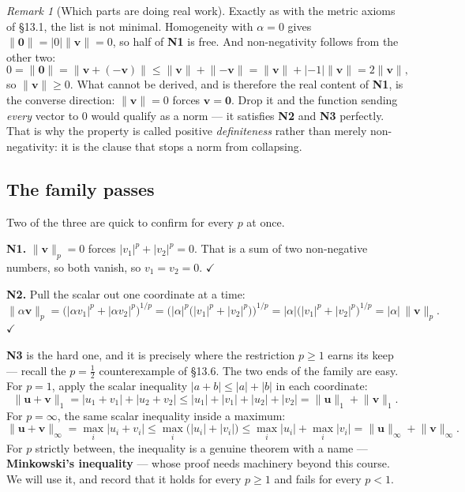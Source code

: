 \documentclass[11pt]{article}
\theoremstyle{definition}
\theoremstyle{remark}
\newtheorem*{rmk}{Remark}
\newcommand{\vc}[1]{\mathbf{#1}}
\newcommand{\norm}[1]{\lVert #1\rVert}
\begin{document}
\begin{rmk}[Which parts are doing real work]
Exactly as with the metric axioms of \S13.1, the list is not minimal.
Homogeneity with $\alpha=0$ gives $\norm{\vc{0}}=\lvert 0\rvert\norm{\vc{v}}=0$,
so half of \textbf{N1} is free. And non-negativity follows from the other two:
\[
  0 = \norm{\vc{0}} = \norm{\vc{v}+(-\vc{v})}
    \le \norm{\vc{v}}+\norm{-\vc{v}}
    = \norm{\vc{v}}+\lvert-1\rvert\norm{\vc{v}}
    = 2\norm{\vc{v}} ,
\]
so $\norm{\vc{v}}\ge0$. What cannot be derived, and is therefore the real
content of \textbf{N1}, is the converse direction: $\norm{\vc{v}}=0$ forces
$\vc{v}=\vc{0}$. Drop it and the function sending \emph{every} vector to $0$
would qualify as a norm --- it satisfies \textbf{N2} and \textbf{N3} perfectly.
That is why the property is called positive \emph{definiteness} rather than
merely non-negativity: it is the clause that stops a norm from collapsing.
\end{rmk}

\subsection{The family passes}
Two of the three are quick to confirm for every $p$ at once.

\smallskip
\noindent\textbf{N1.} $\norm{\vc{v}}_p=0$ forces
$\lvert v_1\rvert^{p}+\lvert v_2\rvert^{p}=0$. That is a sum of two
non-negative numbers, so both vanish, so $v_1=v_2=0$. \hfill$\checkmark$

\smallskip
\noindent\textbf{N2.} Pull the scalar out one coordinate at a time:
\[
  \norm{\alpha\vc{v}}_p
  = \bigl(\lvert\alpha v_1\rvert^{p}+\lvert\alpha v_2\rvert^{p}\bigr)^{1/p}
  = \bigl(\lvert\alpha\rvert^{p}
     \bigl(\lvert v_1\rvert^{p}+\lvert v_2\rvert^{p}\bigr)\bigr)^{1/p}
  = \lvert\alpha\rvert
     \bigl(\lvert v_1\rvert^{p}+\lvert v_2\rvert^{p}\bigr)^{1/p}
  = \lvert\alpha\rvert\,\norm{\vc{v}}_p .
\]
\hfill$\checkmark$

\smallskip
\noindent\textbf{N3} is the hard one, and it is precisely where the restriction
$p\ge1$ earns its keep --- recall the $p=\tfrac12$ counterexample of \S13.6. The
two ends of the family are easy. For $p=1$, apply the scalar inequality
$\lvert a+b\rvert\le\lvert a\rvert+\lvert b\rvert$ in each coordinate:
\[
  \norm{\vc{u}+\vc{v}}_1
  = \lvert u_1+v_1\rvert+\lvert u_2+v_2\rvert
  \le \lvert u_1\rvert+\lvert v_1\rvert+\lvert u_2\rvert+\lvert v_2\rvert
  = \norm{\vc{u}}_1+\norm{\vc{v}}_1 .
\]
For $p=\infty$, the same scalar inequality inside a maximum:
\[
  \norm{\vc{u}+\vc{v}}_\infty
  = \max_i\lvert u_i+v_i\rvert
  \le \max_i\bigl(\lvert u_i\rvert+\lvert v_i\rvert\bigr)
  \le \max_i\lvert u_i\rvert+\max_i\lvert v_i\rvert
  = \norm{\vc{u}}_\infty+\norm{\vc{v}}_\infty .
\]
For $p$ strictly between, the inequality is a genuine theorem with a name ---
\textbf{Minkowski's inequality} --- whose proof needs machinery beyond this
course. We will use it, and record that it holds for every $p\ge1$ and fails for
every $p<1$.
\end{document}
